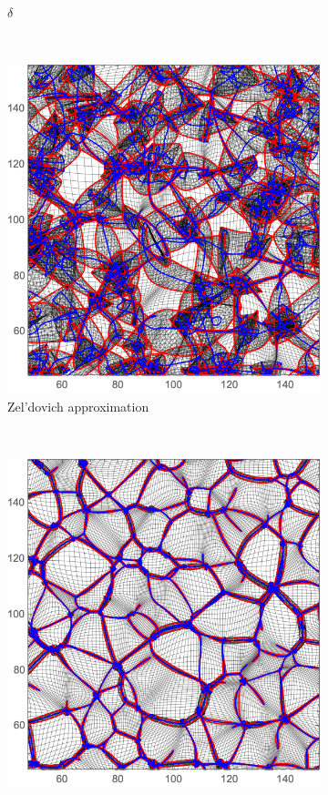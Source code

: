 \documentclass[a4paper, 11pt]{article}
\begin{document}
\begin{figure}
\begin{subfigure}[b]{0.49\textwidth}
\caption{$\delta$}
\end{subfigure}\\
\begin{subfigure}[b]{0.49\textwidth}
\includegraphics[width=\textwidth]{Eulerian_Z}
\caption{Zel'dovich approximation}
\end{subfigure}~
\begin{subfigure}[b]{0.49\textwidth}
\includegraphics[width=\textwidth]{Eulerian_Nb}

\end{subfigure}
\end{figure}
\end{document}
